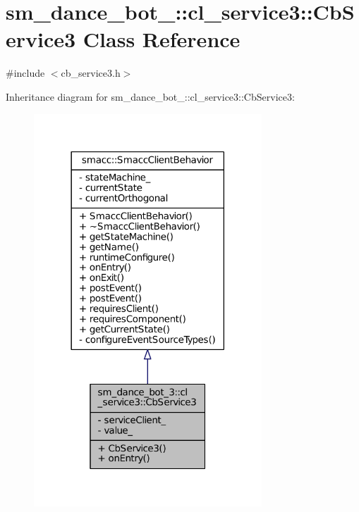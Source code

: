 \hypertarget{classsm__dance__bot__3_1_1cl__service3_1_1CbService3}{}\section{sm\+\_\+dance\+\_\+bot\+\_\+:\+:cl\+\_\+service3\+:\+:Cb\+Service3 Class Reference}
\label{classsm__dance__bot__3_1_1cl__service3_1_1CbService3}


{\ttfamily \#include $<$cb\+\_\+service3.\+h$>$}



Inheritance diagram for sm\+\_\+dance\+\_\+bot\+\_\+:\+:cl\+\_\+service3\+:\+:Cb\+Service3\+:
\nopagebreak
\begin{figure}[H]
\begin{center}
\leavevmode
\includegraphics[width=242pt]{classsm__dance__bot__3_1_1cl__service3_1_1CbService3__inherit__graph}
\end{center}
\end{figure}



